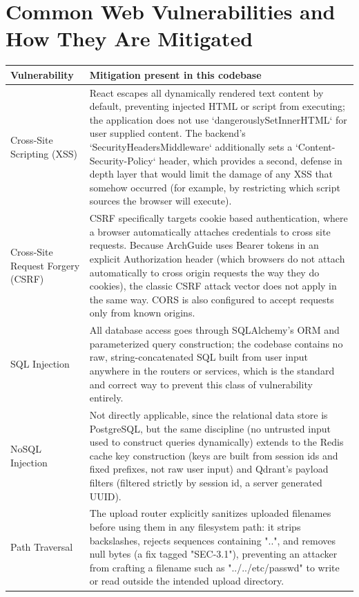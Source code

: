 \documentclass[11pt,a4paper]{report}
\begin{document}
\section{Common Web Vulnerabilities and How They Are Mitigated}

\begin{longtable}{p{3.0cm}p{9.4cm}}
\toprule
\textbf{Vulnerability} & \textbf{Mitigation present in this codebase} \\
\midrule
\endhead
Cross-Site Scripting (XSS) & React escapes all dynamically rendered text content by default, preventing injected HTML or script from executing; the application does not use `dangerouslySetInnerHTML` for user supplied content. The backend's `SecurityHeadersMiddleware` additionally sets a `Content-Security-Policy` header, which provides a second, defense in depth layer that would limit the damage of any XSS that somehow occurred (for example, by restricting which script sources the browser will execute). \\
Cross-Site Request Forgery (CSRF) & CSRF specifically targets cookie based authentication, where a browser automatically attaches credentials to cross site requests. Because ArchGuide uses Bearer tokens in an explicit Authorization header (which browsers do not attach automatically to cross origin requests the way they do cookies), the classic CSRF attack vector does not apply in the same way. CORS is also configured to accept requests only from known origins. \\
SQL Injection & All database access goes through SQLAlchemy's ORM and parameterized query construction; the codebase contains no raw, string-concatenated SQL built from user input anywhere in the routers or services, which is the standard and correct way to prevent this class of vulnerability entirely. \\
NoSQL Injection & Not directly applicable, since the relational data store is PostgreSQL, but the same discipline (no untrusted input used to construct queries dynamically) extends to the Redis cache key construction (keys are built from session ids and fixed prefixes, not raw user input) and Qdrant's payload filters (filtered strictly by session id, a server generated UUID). \\
Path Traversal & The upload router explicitly sanitizes uploaded filenames before using them in any filesystem path: it strips backslashes, rejects sequences containing "..", and removes null bytes (a fix tagged "SEC-3.1"), preventing an attacker from crafting a filename such as "../../etc/passwd" to write or read outside the intended upload directory. \\

\end{longtable}
\end{document}
